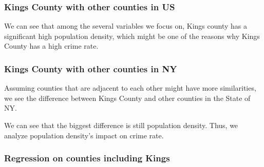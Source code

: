 \documentclass{beamer}
\begin{document}
\begin{frame}[fragile]
\frametitle{Kings County with other counties in US}
We can see that among the several variables we focus on, Kings county has a significant high population density, which might be one of the reasons why Kings County has a high crime rate.
\begin{center}
\end{center}
\end{frame}



\begin{frame}[fragile]
\frametitle{Kings County with other counties in NY}
Assuming counties that are adjacent to each other might have more similarities, we see the difference between Kings County and other counties in the State of NY.
\begin{center}
\end{center}
We can see that the biggest difference is still population density. Thus, we analyze population density's impact on crime rate.
\end{frame}


\begin{frame}[fragile]
\frametitle{Regression on counties including Kings}
\begin{center}
\end{center}
\end{frame}
\end{document}
